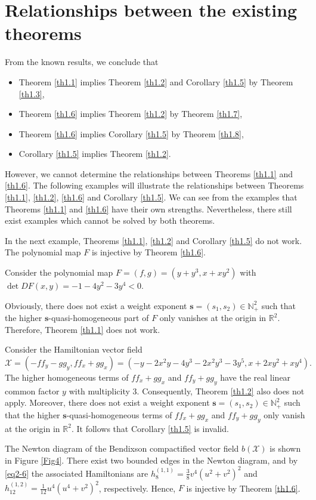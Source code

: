 \documentclass[reqno]{amsart}
\begin{document}
\section{Relationships between the existing theorems}\label{sec4}
From the known results, we conclude that 
\begin{itemize}
\item[(i)] Theorem \ref{th1.1} implies Theorem \ref{th1.2} and Corollary \ref{th1.5} 
by Theorem \ref{th1.3},

\item[(ii)] Theorem \ref{th1.6} implies  Theorem \ref{th1.2} by Theorem \ref{th1.7},

\item[(iii)] Theorem \ref{th1.6} implies Corollary \ref{th1.5} by Theorem \ref{th1.8},

\item[(iv)] Corollary \ref{th1.5} implies Theorem \ref{th1.2}.
\end{itemize}
However, we cannot determine the relationships between Theorems \ref{th1.1} and 
\ref{th1.6}. The following examples will illustrate the relationships between 
Theorems \ref{th1.1}, \ref{th1.2}, \ref{th1.6} and Corollary \ref{th1.5}.
We can see from the examples that Theorems \ref{th1.1} and \ref{th1.6} have their 
own strengths. Nevertheless, there still exist examples which cannot be solved 
by both theorems.

In the next example, Theorems \ref{th1.1}, \ref{th1.2} and Corollary \ref{th1.5} 
do not work. The polynomial map $F$ is injective by Theorem \ref{th1.6}.

\begin{example}\label{ex4.1} \rm
Consider the polynomial map $F=(f,g)=(y+y^3,x+xy^2)$ with 
$\det DF(x,y)=-1-4y^2-3y^4< 0$.

Obviously, there does not exist a weight exponent 
$\mathbf{s}=(s_1,s_2)\in\mathbb{N}_{+}^{2}$ such that the higher 
$\mathbf{s}$-quasi-homogeneous part of $F$ only vanishes at the origin in 
$\mathbb{R}^2$. Therefore, Theorem \ref{th1.1} does not work.

Consider the Hamiltonian vector field
\[
    \mathcal{X}=(-ff_y-gg_y,ff_x+gg_x)=(-y-2x^2y-4y^3-2x^2y^3-3y^5,x+2xy^2+xy^4).
\]
The higher homogeneous terms of $ff_x+gg_x$ and $ff_y+gg_y$ have the real linear 
common factor $y$ with multiplicity 3. Consequently, Theorem \ref{th1.2} also does not 
apply. Moreover, there does not exist a weight exponent
$\mathbf{s}=(s_1,s_2)\in\mathbb{N}_{+}^{2}$ such that the higher 
$\mathbf{s}$-quasi-homogeneous terms of $ff_x+gg_x$ and $ff_y+gg_y$ only vanish at 
the origin in $\mathbb{R}^2$. It follows that Corollary \ref{th1.5} is invalid.

The Newton diagram of the Bendixson compactified vector field $b(\mathcal{X})$ is 
shown in Figure \ref{Fig4}. There exist two bounded edges in the Newton diagram, and 
by \eqref{eq2-6} the associated Hamiltonians are 
$h_8^{(1,1)}=\frac{3}{8}v^4(u^2+v^2)^2$ and $ h_{12}^{(1,2)}=\frac{1}{12}u^4(u^4+v^2)^2$, 
respectively. Hence, $F$ is injective by Theorem \ref{th1.6}.
\end{example}
\end{document}
